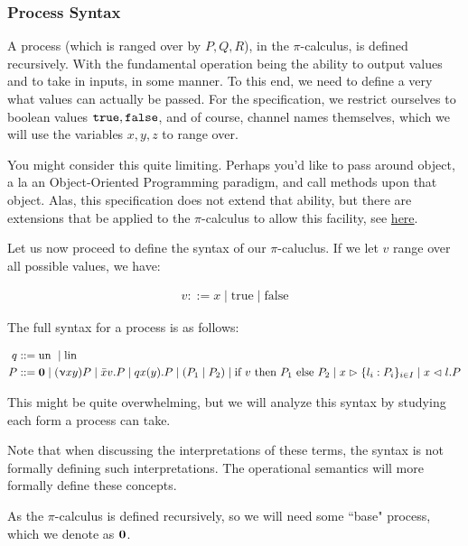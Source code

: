 \subsubsection{Process Syntax}
A process (which is ranged over by $P,Q,R$), in the $\pi$-calculus, is defined recursively. With the fundamental operation being the ability to output values and to take in inputs, in some manner. To this end, we need to define a very what values can actually be passed. For the specification, we restrict ourselves to boolean values $\verb`true`, \verb`false`$, and of course, channel names themselves, which we will use the variables $x,y,z$ to range over.

You might consider this quite limiting. Perhaps you'd like to pass around object, a la an Object-Oriented Programming paradigm, and call methods upon that object. Alas, this specification does not extend that ability, but there are extensions that be applied to the $\pi$-calculus to allow this facility, see \href{https://www.di.fc.ul.pt/~vv/papers/vasconcelos_session-types-programming.pdf }{here}.

Let us now proceed to define the syntax of our $\pi$-caluclus. If we let $v$ range over all possible values, we have:

\begin{align*}
    v ::= x \mid \text{true} \mid \text{false}
\end{align*}

The full syntax for a process is as follows:

\begin{align*}
q &::= \text{un } \mid \text{lin } \\
P &::= \textbf{0} \mid (\upnu xy) P \mid \bar{x}v.P \mid q x(y). P \mid (P_1 \mid P_2) \mid \text{if } v \text{ then } P_1 \text{ else } P_2 \mid  x \vartriangleright \{l_i : P_i\}_{i \in I} \mid x \vartriangleleft l . P
\end{align*}

This might be quite overwhelming, but we will analyze this syntax by studying each form a process can take.

Note that when discussing the interpretations of these terms, the syntax is not formally defining such interpretations. The operational semantics will more formally define these concepts. 

As the $\pi$-calculus is defined recursively, so we will need some ``base" process, which we denote as $\textbf{0}$.

